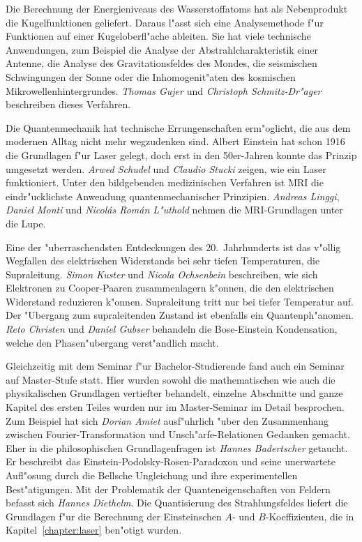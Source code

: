 Die Berechnung der Energieniveaus des Wasserstoffatoms hat als
Nebenprodukt die Kugelfunktionen geliefert.
Daraus l"asst sich eine Analysemethode f"ur Funktionen auf einer
Kugeloberfl"ache ableiten.
Sie hat viele technische Anwendungen, zum Beispiel die Analyse der
Abstrahlcharakteristik einer Antenne, die Analyse des Gravitationsfeldes des
Mondes, die seismischen Schwingungen der Sonne oder die Inhomogenit"aten des
kosmischen Mikrowellenhintergrundes.
{\em Thomas Gujer} und {\em Christoph Schmitz-Dr"ager} beschreiben
dieses Verfahren.

Die Quantenmechanik hat technische Errungenschaften erm"oglicht, die
aus dem modernen Alltag nicht mehr wegzudenken sind.
Albert Einstein hat schon 1916 die Grundlagen f"ur Laser gelegt,
doch erst in den 50er-Jahren konnte das Prinzip umgesetzt werden.
{\em Arwed Schudel} und {\em Claudio Stucki} zeigen, wie ein Laser funktioniert.
Unter den bildgebenden medizinischen Verfahren ist MRI die eindr"ucklichste
Anwendung quantenmechanischer Prinzipien.
{\em Andreas Linggi}, {\em Daniel Monti} und {\em Nicol\'as Rom\'an L"uthold}
nehmen die MRI-Grundlagen unter die Lupe.

Eine der "uberraschendsten Entdeckungen des 20.~Jahrhunderts ist das
v"ollig Wegfallen des elektrischen Widerstands bei sehr tiefen 
Temperaturen, die Supraleitung.
{\em Simon Kuster} und {\em Nicola Ochsenbein} beschreiben, wie sich
Elektronen zu Cooper-Paaren zusammenlagern k"onnen, die
den elektrischen Widerstand reduzieren k"onnen.
Supraleitung tritt nur bei tiefer Temperatur auf.
Der "Ubergang zum supraleitenden Zustand ist ebenfalls ein Quantenph"anomen.
{\em Reto Christen} und {\em Daniel Gubser} behandeln die Bose-Einstein
Kondensation, welche den Phasen"ubergang verst"andlich macht.

Gleichzeitig mit dem Seminar f"ur Bachelor-Studierende fand auch ein
Seminar auf Master-Stufe statt.
Hier wurden sowohl die mathematischen wie auch die physikalischen Grundlagen
vertiefter behandelt, einzelne Abschnitte und ganze Kapitel des ersten
Teiles wurden nur im Master-Seminar im Detail besprochen.
Zum Beispiel hat sich {\em Dorian Amiet} ausf"uhrlich
"uber den Zusammenhang zwischen Fourier-Transformation und 
Unsch"arfe-Relationen Gedanken gemacht.
Eher in die philosophischen Grundlagenfragen ist {\em Hannes Badertscher}
getaucht. Er beschreibt das Einstein-Podolsky-Rosen-Paradoxon und seine
unerwartete Aufl"osung durch die Bellsche Ungleichung und ihre experimentellen
Best"atigungen.
Mit der Problematik der Quanteneigenschaften von Feldern befasst sich
{\em Hannes Diethelm}. 
Die Quantisierung des Strahlungsfeldes liefert die Grundlagen f"ur die
Berechnung der Einsteinschen $A$- und $B$-Koeffizienten, die in 
Kapitel~\ref{chapter:laser} ben"otigt wurden.


